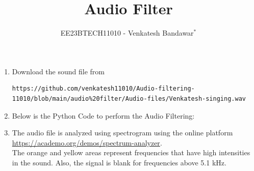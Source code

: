 \documentclass[journal,12pt,twocolumn]{IEEEtran}
\theoremstyle{remark}
\begin{document}

\vspace{3cm}
\title{Audio Filter}
\author{EE23BTECH11010 - Venkatesh Bandawar$^{*}$%
}
\maketitle
\newpage
\bigskip
\renewcommand{\thefigure}{\arabic{figure}}
\renewcommand{\thetable}{\theenumi}


\begin{enumerate}[label=\thesection.\arabic*
,ref=\thesection.\theenumi]
\section{Digital Filter}
\label{input_sound}
\item Download the sound file from
\begin{lstlisting}
https://github.com/venkatesh11010/Audio-filtering-11010/blob/main/audio%20filter/Audio-files/Venkatesh-singing.wav
\end{lstlisting}
\item 
\label{Python code}
Below is the Python Code to perform the Audio Filtering:
\label{py:audio_filtering_code}

\item 
\label{Visualization}

The audio file is analyzed using spectrogram using the online platform \href{https://academo.org/demos/spectrum-analyzer}{\url{https://academo.org/demos/spectrum-analyzer}}.\\
The orange and yellow areas represent frequencies that have high intensities in the sound.
Also, the signal is blank for frequencies above
5.1 kHz.



\end{enumerate}
\end{document}
